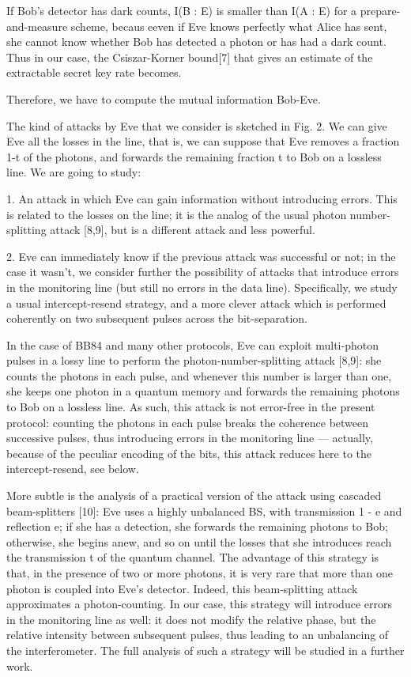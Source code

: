 If Bob’s detector has dark counts, I(B : E) is smaller than I(A : E) for a prepare-and-measure scheme, becaus eeven if Eve knows perfectly what Alice has sent, she cannot know whether Bob has detected a photon or has had a dark count. Thus in our case, the Csiszar-Korner bound[7] that gives an estimate of the extractable secret key rate becomes.

Therefore, we have to compute the mutual information Bob-Eve.

The kind of attacks by Eve that we consider is sketched in Fig. 2. We can give Eve all the losses in the line, that is, we can suppose that Eve removes a fraction 1-t of the photons, and forwards the remaining fraction t to Bob on a lossless line. We are going to study:

1. An attack in which Eve can gain information without introducing errors. This is related to the losses on the line; it is the analog of the usual photon number-splitting attack [8,9], but is a different attack and less powerful.


2. Eve can immediately know if the previous attack was successful or not; in the case it wasn’t, we consider further the possibility of attacks that introduce errors in the monitoring line (but still no errors in the data line). Specifically, we study a usual intercept-resend strategy, and a more clever attack which is performed coherently on two subsequent pulses across the bit-separation.

In the case of BB84 and many other protocols, Eve can exploit multi-photon pulses in a lossy line to perform the photon-number-splitting attack [8,9]: she counts the photons in each pulse, and whenever this number is larger than one, she keeps one photon in a quantum memory and forwards the remaining photons to Bob on a lossless line. As such, this attack is not error-free in the present protocol: counting the photons in each pulse breaks the coherence between successive pulses, thus introducing errors in the monitoring line — actually, because of the peculiar encoding of the bits, this attack reduces here to the intercept-resend, see below.

More subtle is the analysis of a practical version of the attack using cascaded beam-splitters [10]: Eve uses a highly unbalanced BS, with transmission 1 - e and reflection e; if she has a detection, she forwards the remaining photons to Bob; otherwise, she begins anew, and so on until the losses that she introduces reach the transmission t of the quantum channel. The advantage of this strategy is that, in the presence of two or more photons, it is very rare that more than one photon is coupled into Eve’s detector. Indeed, this beam-splitting attack approximates a photon-counting. In our case, this strategy will introduce errors in the monitoring line as well: it does not modify the relative phase, but the relative intensity between subsequent pulses, thus leading to an unbalancing of the interferometer. The full analysis of such a strategy will be studied in a further work.

